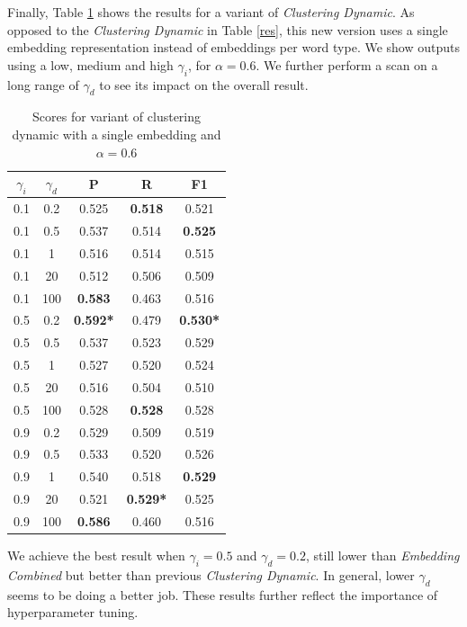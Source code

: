 \documentclass{article}
\begin{document}
Finally, Table \ref{varyinggamma} shows the results for a variant of {\textit{Clustering Dynamic}}. As opposed to the {\textit{Clustering Dynamic}} in Table \ref{res}, this new version uses a single embedding representation instead of embeddings per word type. We show outputs using a low, medium and high $\gamma_i$, for $\alpha=0.6$. We further perform a scan on a long range of $\gamma_d$ to see its impact on the overall result. 

\begin{table}[H]
\center
\begin{tabular}{|c|c|c|c|c|} \hline
$\gamma_i$ & $\gamma_d$ & \textbf{P} & \textbf{R} & \textbf{F1} \\ \hline\hline
0.1 & 0.2 & 0.525 & \textbf{0.518} & 0.521 \\ \hline
0.1 & 0.5 & 0.537 & 0.514 & \textbf{0.525} \\ \hline
0.1 & 1   & 0.516 & 0.514 & 0.515 \\ \hline
0.1 & 20  & 0.512 & 0.506 & 0.509 \\ \hline
0.1 & 100 & \textbf{0.583} & 0.463 & 0.516 \\ \hline\hline
0.5 & 0.2 & \textbf{0.592*} & 0.479 & \textbf{0.530*} \\ \hline
0.5 & 0.5 & 0.537 & 0.523 & 0.529 \\ \hline
0.5 & 1   & 0.527 & 0.520 & 0.524 \\ \hline
0.5 & 20  & 0.516 & 0.504 & 0.510 \\ \hline
0.5 & 100 & 0.528 & \textbf{0.528} & 0.528 \\ \hline\hline
0.9 & 0.2 & 0.529 & 0.509 & 0.519 \\ \hline
0.9 & 0.5 & 0.533 & 0.520 & 0.526 \\ \hline
0.9 & 1   & 0.540 & 0.518 & \textbf{0.529} \\ \hline
0.9 & 20  & 0.521 & \textbf{0.529*} & 0.525 \\ \hline
0.9 & 100 & \textbf{0.586} & 0.460 & 0.516 \\ \hline
\end{tabular}
\caption{Scores for variant of clustering dynamic with a single embedding and $\alpha=0.6$}
\label{varyinggamma}
\end{table}

We achieve the best result when $\gamma_i=0.5$ and $\gamma_d=0.2$, still lower than \textit{Embedding Combined} but better than previous {\textit{Clustering Dynamic}}. In general, lower $\gamma_d$ seems to be doing a better job. These results further reflect the importance of hyperparameter tuning.
\end{document}
